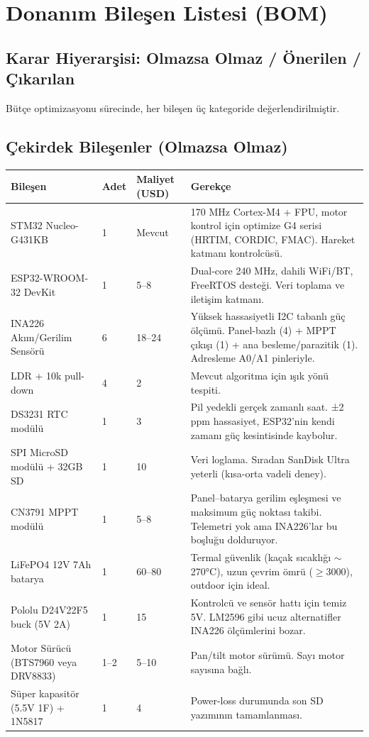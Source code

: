 \documentclass[11pt,a4paper]{article}
\begin{document}
\section{Donanım Bileşen Listesi (BOM)}

\subsection{Karar Hiyerarşisi: Olmazsa Olmaz / Önerilen / Çıkarılan}

Bütçe optimizasyonu sürecinde, her bileşen üç kategoride değerlendirilmiştir.

\subsection{Çekirdek Bileşenler (Olmazsa Olmaz)}

\begin{longtable}{|p{4.5cm}|p{1.3cm}|p{1.5cm}|p{6cm}|}
\hline
\rowcolor{primary!15}
\textbf{Bileşen} & \textbf{Adet} & \textbf{Maliyet (USD)} & \textbf{Gerekçe} \\
\hline
\endhead

STM32 Nucleo-G431KB & 1 & Mevcut & 170 MHz Cortex-M4 + FPU, motor kontrol için optimize G4 serisi (HRTIM, CORDIC, FMAC). Hareket katmanı kontrolcüsü. \\
\hline
ESP32-WROOM-32 DevKit & 1 & 5--8 & Dual-core 240 MHz, dahili WiFi/BT, FreeRTOS desteği. Veri toplama ve iletişim katmanı. \\
\hline
INA226 Akım/Gerilim Sensörü & 6 & 18--24 & Yüksek hassasiyetli I2C tabanlı güç ölçümü. Panel-bazlı (4) + MPPT çıkışı (1) + ana besleme/parazitik (1). Adresleme A0/A1 pinleriyle. \\
\hline
LDR + 10k pull-down & 4 & 2 & Mevcut algoritma için ışık yönü tespiti. \\
\hline
DS3231 RTC modülü & 1 & 3 & Pil yedekli gerçek zamanlı saat. ±2 ppm hassasiyet, ESP32'nin kendi zamanı güç kesintisinde kaybolur. \\
\hline
SPI MicroSD modülü + 32GB SD & 1 & 10 & Veri loglama. Sıradan SanDisk Ultra yeterli (kısa-orta vadeli deney). \\
\hline
CN3791 MPPT modülü & 1 & 5--8 & Panel--batarya gerilim eşleşmesi ve maksimum güç noktası takibi. Telemetri yok ama INA226'lar bu boşluğu dolduruyor. \\
\hline
LiFePO4 12V 7Ah batarya & 1 & 60--80 & Termal güvenlik (kaçak sıcaklığı $\sim$270°C), uzun çevrim ömrü ($\geq$3000), outdoor için ideal. \\
\hline
Pololu D24V22F5 buck (5V 2A) & 1 & 15 & Kontrolcü ve sensör hattı için temiz 5V. LM2596 gibi ucuz alternatifler INA226 ölçümlerini bozar. \\
\hline
Motor Sürücü (BTS7960 veya DRV8833) & 1--2 & 5--10 & Pan/tilt motor sürümü. Sayı motor sayısına bağlı. \\
\hline
Süper kapasitör (5.5V 1F) + 1N5817 & 1 & 4 & Power-loss durumunda son SD yazımının tamamlanması. \\
\hline
\end{longtable}
\end{document}
